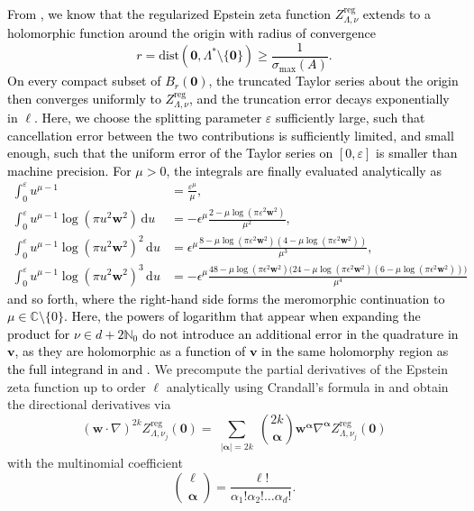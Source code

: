 \documentclass[]{amsart}
\numberwithin{mythm}{section}
\newcommand{\new}[1]{{\textcolor{black}{#1}}}
\begin{document}
\new{
From , we know that the regularized Epstein zeta function $Z^\mathrm{reg}_{\Lambda,\nu}$ extends to a holomorphic function around the origin with radius of convergence \[r=\mathrm{dist}(\bm 0,\Lambda^\ast\setminus\{\bm 0\})\ge \frac{1}{\sigma_\mathrm{max}(A)}.\]  On every compact subset of $B_r(\bm 0)$, the truncated Taylor series about the origin then converges uniformly to $Z^\mathrm{reg}_{\Lambda,\nu}$, and the truncation error decays exponentially in $\ell$. Here, we choose the splitting parameter $\varepsilon$ sufficiently large, such that cancellation error between the two contributions is sufficiently limited, and small enough, such that the uniform error of the Taylor series on $[0,\varepsilon]$ is smaller than machine precision.
}
\new{For $\mu>0$, the integrals are finally evaluated analytically as}
\new{\begin{align*}
\int_{0}^\varepsilon u^{\mu-1} &=\frac{\varepsilon^{\mu}}{\mu},\\ 
\int_{0}^\varepsilon u^{\mu-1} \log(\pi u^2{\bm w}^2) \,\mathrm d u &= -\epsilon^{\mu} \frac{2-\mu\log(\pi \varepsilon^2{\bm w}^2)}{\mu^2},\\
\int_{0}^\varepsilon u^{\mu-1} \log(\pi u^2{\bm w}^2)^2 \,\mathrm d u &= \epsilon^{\mu} \frac{8-\mu\log(\pi \varepsilon^2{\bm w}^2)(4 -\mu\log(\pi \varepsilon^2{\bm w}^2))}{\mu^3},\\
\int_{0}^\varepsilon u^{\mu-1} \log(\pi u^2{\bm w}^2)^3 \,\mathrm d u &= -\epsilon^{\mu} \frac{48 -\mu \log(\pi \epsilon^2{\bm w}^2) \big(24 -\mu\log(\pi \epsilon^2{\bm w}^2)(6 -\mu \log(\pi \epsilon^2{\bm w}^2))\big)}{\mu^4}
\end{align*}
and so forth, where the right-hand side forms the meromorphic continuation to $\mu\in \mathds C\setminus\{0\}$.}
\new{
Here, the powers of logarithm that appear when expanding the product for $\nu\in d+2\mathds N_0$ do not introduce an additional error in the quadrature in $\bm v$, as they are holomorphic as a function of $\bm v$ in the same holomorphy region as the full integrand in \Cref{hol-integrand} and \Cref{hol-bernstein}.
}
We precompute the partial derivatives of the Epstein zeta function up to order $\ell$ analytically using  Crandall's formula in \cite{buchheit2024computation,buchheit2024epstein} and obtain the directional derivatives via
\[
(\bm w\cdot \nabla)^{2k}Z^{\mathrm{reg}}_{\Lambda,\nu_j}(\bm 0) = \sum_{\substack{\vert \bm \alpha\vert =2k}} \binom{2k
}{\bm \alpha} {\bm w}^{\bm \alpha} { \nabla}^{\bm \alpha} Z^{\mathrm{reg}}_{\Lambda,\nu_j}(\bm 0)
\]
with the multinomial coefficient
\[
\binom{\ell 
}{\bm \alpha} = \frac{\ell!}{\alpha_1! \alpha_2! \dots \alpha_d !}.
\]
\end{document}
